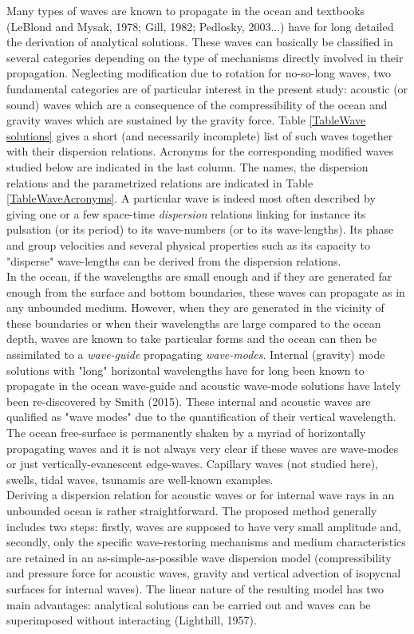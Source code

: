 \documentclass[a4paper,11pt]{article}
\begin{document}
Many types of waves are known to propagate in the ocean and textbooks (LeBlond and Mysak, 1978; Gill, 1982; Pedlosky, 2003...) have for long detailed the derivation of analytical solutions. These waves can basically be classified in several categories depending on the type of mechanisms directly involved in their propagation. Neglecting modification due to rotation for no-so-long waves, two fundamental categories are of particular interest in the present study: acoustic (or sound) waves which are a consequence of the compressibility of the ocean and gravity waves which are sustained by the gravity force. Table \ref{TableWave solutions} gives a short (and necessarily incomplete) list of such waves together with their dispersion relations. Acronyms for the corresponding modified waves studied below are indicated in the last column. The names, the dispersion relations and the parametrized relations are indicated in Table \ref{TableWaveAcronyms}. A particular wave is indeed most often described by giving one or a few space-time \textit{dispersion} relations linking for instance its pulsation (or its period) to its wave-numbers (or to its wave-lengths). Its phase and group velocities and several physical properties such as its capacity to "disperse" wave-lengths can be derived from the dispersion relations.\\
In the ocean, if the wavelengths are small enough and if they are generated far enough from the surface and bottom boundaries, these waves can propagate as in any unbounded medium. However, when they are generated in the vicinity of these boundaries or when their wavelengths are large compared to the ocean depth, waves are known to take particular forms and the ocean can then be assimilated to a \textit{wave-guide} propagating \textit{wave-modes}. Internal (gravity) mode solutions with "long" horizontal wavelengths have for long been known to propagate in the ocean wave-guide and acoustic wave-mode solutions have lately been re-discovered by Smith (2015). These internal and acoustic waves are qualified as "wave modes" due to the quantification of their vertical wavelength.\\
The ocean free-surface is permanently shaken by a myriad of horizontally propagating waves and it is not always very clear if these waves are wave-modes or just vertically-evanescent edge-waves. Capillary waves (not studied here), swells, tidal waves, tsunamis are well-known examples.\\
Deriving a dispersion relation for acoustic waves or for internal wave rays in an unbounded ocean is rather straightforward. The proposed method generally includes two steps: firstly, waves are supposed to have very small amplitude and, secondly, only the specific wave-restoring mechanisms and medium characteristics are retained in an as-simple-as-possible wave dispersion model (compressibility and pressure force for acoustic waves, gravity and vertical advection of isopycnal surfaces for internal waves). The linear nature of the resulting model has two main advantages: analytical solutions can be carried out and waves can be superimposed without interacting (Lighthill, 1957).
\end{document}
